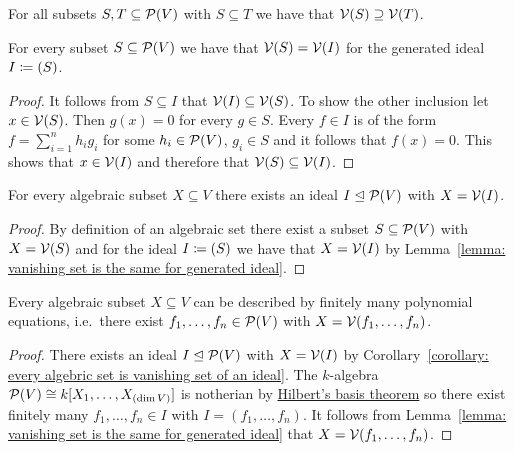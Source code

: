 


\begin{lemma}
  For all subsets $S, T \subseteq \mathcal{P}(V)$ with $S \subseteq T$ we have that $\mathcal{V}(S) \supseteq \mathcal{V}(T)$.
\end{lemma}


\begin{lemma}
  \label{lemma: vanishing set is the same for generated ideal}
  For every subset $S \subseteq \mathcal{P}(V)$ we have that $\mathcal{V}(S) = \mathcal{V}(I)$ for the generated ideal $I \coloneqq (S)$.
\end{lemma}


\begin{proof}
  It follows from $S \subseteq I$ that $\mathcal{V}(I) \subseteq \mathcal{V}(S)$.
  To show the other inclusion let $x \in \mathcal{V}(S)$.
  Then $g(x) = 0$ for every $g \in S$.
  Every $f \in I$ is of the form $f = \sum_{i=1}^n h_i g_i$ for some $h_i \in \mathcal{P}(V)$, $g_i \in S$ and it follows that $f(x) = 0$.
  This shows that $x \in \mathcal{V}(I)$ and therefore that $\mathcal{V}(S) \subseteq \mathcal{V}(I)$.
\end{proof}


\begin{corollary}
  \label{corollary: every algebric set is vanishing set of an ideal}
  For every algebraic subset $X \subseteq V$ there exists an ideal $I \trianglelefteq \mathcal{P}(V)$ with $X = \mathcal{V}(I)$.
\end{corollary}


\begin{proof}
  By definition of an algebraic set there exist a subset $S \subseteq \mathcal{P}(V)$ with $X = \mathcal{V}(S)$ and for the ideal $I \coloneqq (S)$ we have that $X = \mathcal{V}(I)$ by Lemma~\ref{lemma: vanishing set is the same for generated ideal}.
\end{proof}


\begin{corollary}
  Every algebraic subset $X \subseteq V$ can be described by finitely many polynomial equations, i.e.\ there exist $f_1, \dotsc, f_n \in \mathcal{P}(V)$ with $X = \mathcal{V}(f_1, \dotsc, f_n)$.
\end{corollary}


\begin{proof}
  There exists an ideal $I \trianglelefteq \mathcal{P}(V)$ with $X = \mathcal{V}(I)$ by Corollary~\ref{corollary: every algebric set is vanishing set of an ideal}.
  The $k$-algebra $\mathcal{P}(V) \cong k[X_1, \dotsc, X_{(\dim V)}]$ is notherian by \hyperref[theorem: Hilberts basis theorem]{Hilbert’s basis theorem} so there exist finitely many $f_1, \dotsc, f_n \in I$ with $I = (f_1, \dotsc, f_n)$.
  It follows from Lemma~\ref{lemma: vanishing set is the same for generated ideal} that $X = \mathcal{V}(f_1, \dotsc, f_n)$.
\end{proof}













